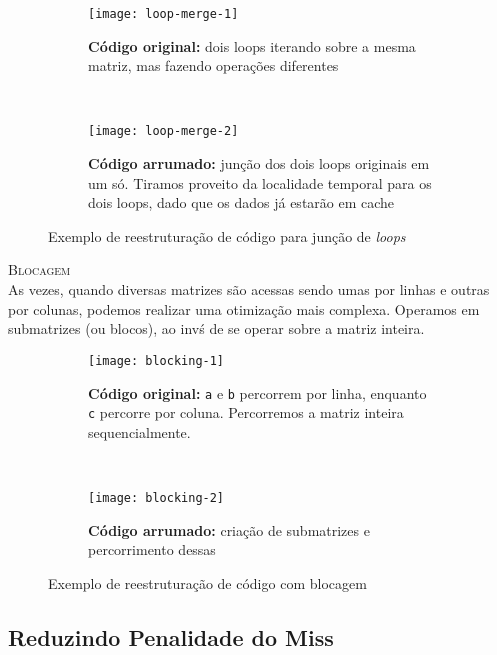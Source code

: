 \begin{figure*}[ht]
  \begin{subfigure}[t]{.5\textwidth}
    \centering
    \texttt{[image: loop-merge-1]}
    \caption{\textbf{Código original:} dois loops iterando sobre a mesma matriz, mas fazendo operações diferentes}
  \end{subfigure}
  ~
  \begin{subfigure}[t]{.5\textwidth}
    \centering
    \texttt{[image: loop-merge-2]}
    \caption{\textbf{Código arrumado:} junção dos dois loops originais em um só. Tiramos proveito da localidade temporal para os dois loops, dado que os dados já estarão em cache}
  \end{subfigure}

  \caption{Exemplo de reestruturação de código para junção de \textit{loops}}
  \label{figs:loop-merge}
\end{figure*}





\textsc{Blocagem}\\
As vezes, quando diversas matrizes são acessas sendo umas por linhas e outras por colunas, podemos realizar uma otimização mais complexa. Operamos em submatrizes (ou blocos), ao invś de se operar sobre a matriz inteira.

\begin{figure*}[ht]
  \begin{subfigure}[t]{.5\textwidth}
    \centering
    \texttt{[image: blocking-1]}
    \caption{\textbf{Código original:} \texttt{a} e \texttt{b} percorrem por linha, enquanto \texttt{c} percorre por coluna. Percorremos a matriz inteira sequencialmente.}
  \end{subfigure}
  ~
  \begin{subfigure}[t]{.5\textwidth}
    \centering
    \texttt{[image: blocking-2]}
    \caption{\textbf{Código arrumado:} criação de submatrizes e percorrimento dessas}
  \end{subfigure}

  \caption{Exemplo de reestruturação de código com blocagem}
  \label{figs:blocking}
\end{figure*}




\subsection{Reduzindo Penalidade do Miss}

